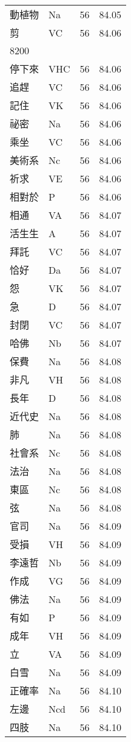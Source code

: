 \documentclass[twocolumn]{book}
\begin{document}
\begin{supertabular}{llrr}
動植物 & Na & 56 &  84.05\\
剪 & VC & 56 &  84.06\\
8200\\
停下來 & VHC & 56 &  84.06\\
追趕 & VC & 56 &  84.06\\
記住 & VK & 56 &  84.06\\
祕密 & Na & 56 &  84.06\\
乘坐 & VC & 56 &  84.06\\
美術系 & Nc & 56 &  84.06\\
祈求 & VE & 56 &  84.06\\
相對於 & P & 56 &  84.06\\
相通 & VA & 56 &  84.07\\
活生生 & A & 56 &  84.07\\
拜託 & VC & 56 &  84.07\\
恰好 & Da & 56 &  84.07\\
怨 & VK & 56 &  84.07\\
急 & D & 56 &  84.07\\
封閉 & VC & 56 &  84.07\\
哈佛 & Nb & 56 &  84.07\\
保費 & Na & 56 &  84.08\\
非凡 & VH & 56 &  84.08\\
長年 & D & 56 &  84.08\\
近代史 & Na & 56 &  84.08\\
肺 & Na & 56 &  84.08\\
社會系 & Nc & 56 &  84.08\\
法治 & Na & 56 &  84.08\\
東區 & Nc & 56 &  84.08\\
弦 & Na & 56 &  84.08\\
官司 & Na & 56 &  84.09\\
受損 & VH & 56 &  84.09\\
李遠哲 & Nb & 56 &  84.09\\
作成 & VG & 56 &  84.09\\
佛法 & Na & 56 &  84.09\\
有如 & P & 56 &  84.09\\
成年 & VH & 56 &  84.09\\
立 & VA & 56 &  84.09\\
白雪 & Na & 56 &  84.09\\
正確率 & Na & 56 &  84.10\\
左邊 & Ncd & 56 &  84.10\\
四肢 & Na & 56 &  84.10\\

\end{supertabular}
\end{document}
